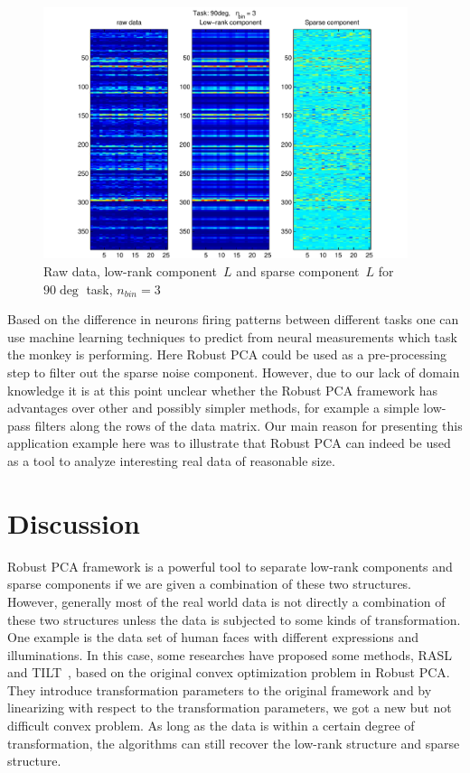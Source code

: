 \documentclass{../../common/projectreport}
\begin{document}
\begin{figure}[h]
\centering
\includegraphics[width=0.95\textwidth]{../figures/BMI_comparison_90deg_3bins}
\caption{Raw data, low-rank component~$L$ and sparse component~$L$ for $90\deg$ task, $n_{bin}=3$}
\label{Applications:RPCAapps:BMI:comparison90deg}
\end{figure}

Based on the difference in neurons firing patterns between different tasks one can use machine learning techniques to predict from neural measurements which task the monkey is performing. Here Robust PCA could be used as a pre-processing step to filter out the sparse noise component. However, due to our lack of domain knowledge it is at this point unclear whether the Robust PCA framework has advantages over other and possibly simpler methods, for example a simple low-pass filters along the rows of the data matrix. Our main reason for presenting this application example here was to illustrate that Robust PCA can indeed be used as a tool to analyze interesting real data of reasonable size. 






\section{Discussion}
Robust PCA framework is a powerful tool to separate low-rank components and sparse components if we are given a combination of these two structures. However, generally most of the real world data is not directly a combination of these two structures unless the data is subjected to some kinds of transformation. One example is the data set of human faces with different expressions and illuminations. In this case, some researches have proposed some methods, RASL~\cite{Peng:2010} and TILT~\cite{Zhang:2011}, based on the original convex optimization problem in Robust PCA. They introduce transformation parameters to the original framework and by linearizing with respect to the transformation parameters, we got a new but not difficult convex problem. As long as the data is within a certain degree of transformation, the algorithms can still recover the low-rank structure and sparse structure.
\end{document}
